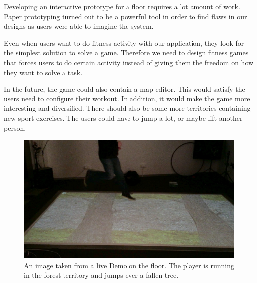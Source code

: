 \documentclass{sigchi}
\begin{document}
  Developing an interactive prototype for a floor requires a lot amount of work. Paper prototyping turned out to be a powerful tool in order to find flaws in our designs as users were able to imagine the system.

  Even when users want to do fitness activity with our application, they look for the simplest solution to solve a game. Therefore we need to design fitness games that forces users to do certain activity instead of giving them the freedom on how they want to solve a task.

  In the future, the game could also contain a map editor. This would satisfy the users need to configure their workout. In addition, it would make the game more interesting and diversified. There should also be some more territories containing new sport exercises. The users could have to jump a lot, or maybe lift another person.

  \newpage

  \begin{figure}[htb]
    \centering
    \includegraphics[width=\linewidth]{Image_22}
    \caption{An image taken from a live Demo on the floor. The player is running in the forest territory and jumps over a fallen tree.}
    \label{fig:copy}
  \end{figure}
\end{document}
